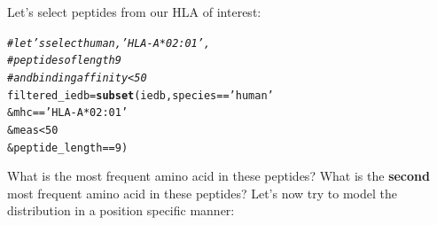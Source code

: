 \documentclass{tufte-book}\usepackage[]{graphicx}\usepackage[]{xcolor}
\makeatletter
\newcommand{\hlnum}[1]{\textcolor[rgb]{0.686,0.059,0.569}{#1}}%
\newcommand{\hlsng}[1]{\textcolor[rgb]{0.192,0.494,0.8}{#1}}%
\newcommand{\hlcom}[1]{\textcolor[rgb]{0.678,0.584,0.686}{\textit{#1}}}%
\newcommand{\hlopt}[1]{\textcolor[rgb]{0,0,0}{#1}}%
\newcommand{\hldef}[1]{\textcolor[rgb]{0.345,0.345,0.345}{#1}}%
\newcommand{\hlkwb}[1]{\textcolor[rgb]{0.69,0.353,0.396}{#1}}%
\newcommand{\hlkwd}[1]{\textcolor[rgb]{0.737,0.353,0.396}{\textbf{#1}}}%
\newenvironment{kframe}{%
 \def\at@end@of@kframe{}%
 \ifinner\ifhmode%
  \def\at@end@of@kframe{\end{minipage}}%
  \begin{minipage}{\columnwidth}%
 \fi\fi%
 \def\FrameCommand##1{\hskip\@totalleftmargin \hskip-\fboxsep
 \colorbox{shadecolor}{##1}\hskip-\fboxsep
     \hskip-\linewidth \hskip-\@totalleftmargin \hskip\columnwidth}%
 \MakeFramed {\advance\hsize-\width
   \@totalleftmargin\z@ \linewidth\hsize
   \@setminipage}}%
 {\par\unskip\endMakeFramed%
 \at@end@of@kframe}
\newenvironment{knitrout}{}{} %
\makeatother
\begin{document}
\noindent Let's select peptides from our HLA of interest:


\begin{knitrout}
\color{fgcolor}\begin{kframe}
\begin{alltt}
\hlcom{# let's select human,  'HLA-A*02:01', }
\hlcom{# peptides of length 9 }
\hlcom{# and binding affinity < 50}
\hldef{filtered_iedb} \hlkwb{=} \hlkwd{subset}\hldef{(iedb, species}\hlopt{==}\hlsng{'human'}
    \hlopt{&} \hldef{mhc}\hlopt{==}\hlsng{'HLA-A*02:01'}
    \hlopt{&} \hldef{meas} \hlopt{<} \hlnum{50}
    \hlopt{&} \hldef{peptide_length} \hlopt{==} \hlnum{9}\hldef{)}
\end{alltt}
\end{kframe}
\end{knitrout}


\noindent What is the most frequent amino acid in these peptides?  What is the \textbf{second} most frequent amino acid in these peptides? Let's now try to model the distribution in a position specific manner: 
\end{document}
